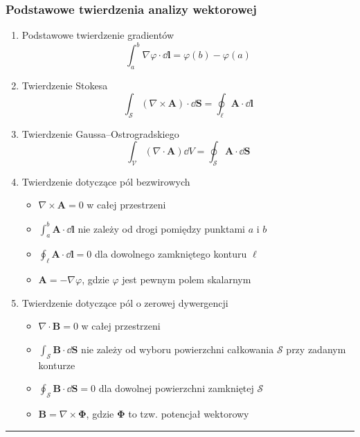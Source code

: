 \documentclass[../main.tex]{subfiles}
\begin{document}
\subsubsection*{Podstawowe twierdzenia analizy wektorowej}
\begin{enumerate}
    \item Podstawowe twierdzenie gradientów
    \begin{equation*}
        \int_a^b\nabla\varphi\cdot\dd{\mathbf{l}}=\varphi(b)-\varphi(a)
    \end{equation*}
    
    \item Twierdzenie Stokesa
    \begin{equation*}
        \int_\mathcal{S}(\nabla\times\mathbf{A})\cdot \dd{\mathbf{S}}=\oint_\ell \mathbf{A}\cdot\dd{\mathbf{l}}
    \end{equation*}
    
    \item Twierdzenie Gaussa--Ostrogradskiego
    \begin{equation*}
        \int_\mathcal{V}(\nabla\cdot \mathbf{A})\dd{V}=\oint_\mathcal{S}\mathbf{A}\cdot\dd{\mathbf{S}}
    \end{equation*}
    
    \item Twierdzenie dotyczące pól bezwirowych
    \begin{itemize}
        \item \(\nabla\times\mathbf{A}=0\) w całej przestrzeni
        \item \(\int_a^b\mathbf{A}\cdot\dd{\mathbf{l}}\) nie zależy od drogi pomiędzy punktami \(a\) i \(b\)
        \item \(\oint_\ell \mathbf{A}\cdot\dd{\mathbf{l}}=0\) dla dowolnego zamkniętego konturu \(\ell\)
        \item \(\mathbf{A}=-\nabla\varphi\), gdzie \(\varphi\) jest pewnym polem skalarnym
    \end{itemize}
    \item Twierdzenie dotyczące pól o zerowej dywergencji
    \begin{itemize}
        \item \(\nabla\cdot \mathbf{B}=0\) w całej przestrzeni
        \item \(\int_\mathcal{S}\mathbf{B}\cdot\dd{\mathbf{S}}\) nie zależy od wyboru powierzchni całkowania \(\mathcal{S}\) przy zadanym konturze
        \item \(\oint_\mathcal{S}\mathbf{B}\cdot\dd{\mathbf{S}}=0\) dla dowolnej powierzchni zamkniętej \(\mathcal{S}\)
        \item \(\mathbf{B}=\nabla\times\boldsymbol{\Phi}\), gdzie \(\boldsymbol{\Phi}\) to tzw. potencjał wektorowy
    \end{itemize}
\end{enumerate}
\noindent\rule{\textwidth}{.5pt}
\end{document}
